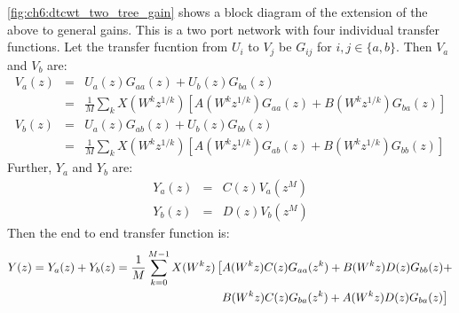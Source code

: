 \begin{figure}
  \centering
  
  \label{fig:ch6:dtcwt_two_tree_gain}
\end{figure}

\autoref{fig:ch6:dtcwt_two_tree_gain} shows a block diagram of the extension of 
the above to general gains. This is a two port network with four individual
transfer functions. Let the transfer fucntion from $U_i$ to $V_j$
be $G_{ij}$ for $i, j \in \{a, b\}$. Then $V_a$ and $V_b$ are:
\begin{eqnarray}
  V_a(z) &=& U_a(z)G_{aa}(z) + U_b(z)G_{ba}(z) \\
         &=& \frac{1}{M} \sum_k X(W^{k} z^{1/k}) \left[A(W^k z^{1/k})G_{aa}(z) +
             B(W^k z^{1/k}) G_{ba}(z) \right] \\
  V_b(z) &=& U_a(z)G_{ab}(z) + U_b(z)G_{bb}(z) \\
         &=& \frac{1}{M} \sum_k X(W^{k} z^{1/k}) \left[A(W^k z^{1/k})G_{ab}(z) +
             B(W^k z^{1/k}) G_{bb}(z) \right] 
\end{eqnarray}
%
Further, $Y_a$ and $Y_b$ are:
\begin{eqnarray}
  Y_a(z) &=& C(z)V_a(z^M) \\
  Y_b(z) &=& D(z)V_b(z^M)
\end{eqnarray}
%
Then the end to end transfer function is:
\begin{equation}
  \begin{split}
    Y(z) = Y_{a}(z) + Y_{b}(z) = \frac{1}{M} \sum_{k=0}^{M-1} X(W^k z)
    & \left[  A(W^kz)C(z)G_{aa}(z^k) + B(W^kz)D(z)G_{bb}(z) + \right. \\
    & \left. \hphantom{[}  B(W^kz)C(z)G_{ba}(z^k) + A(W^kz)D(z)G_{ba}(z) \right] 
    \label{eq:ch6:transfer}
  \end{split}
\end{equation}

